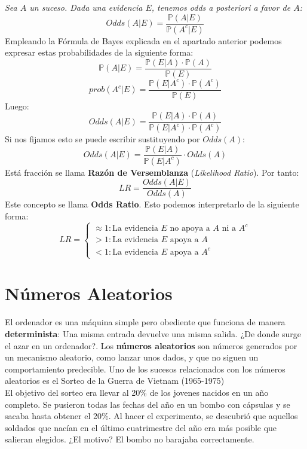 \documentclass[11pt]{article}
\newcommand{\prob}{\mathbb{P}}
\theoremstyle{plain}
\begin{document}
            \textit{Sea $A$ un suceso. Dada una evidencia $E$, tenemos odds a posteriori a favor de $A$:}
            \[Odds(A|E) = \frac{\prob(A|E)}{\prob(A^c|E)}\]
            Empleando la Fórmula de Bayes explicada en el apartado anterior podemos expresar estas probabilidades de la siguiente forma:
            \[\prob(A|E) = \frac{\prob(E|A) \cdot \prob(A)}{\prob(E)}\]
            \[prob(A^c|E) = \frac{\prob(E|A^c)\cdot \prob(A^c)}{\prob(E)}\]
            Luego:
            \[Odds(A|E) = \frac{\prob(E|A) \cdot \prob(A)}{\prob(E|A^c)\cdot \prob(A^c)}\]
            Si nos fijamos esto se puede escribir sustituyendo por $Odds(A)$:
            \[Odds(A|E) = \frac{\prob(E|A)}{\prob(E|A^c)}\cdot Odds(A)\]
            Está fracción se llama \textbf{Razón de Versemblanza} (\textit{Likelihood Ratio}). Por tanto:
            \[LR = \frac{Odds(A|E)}{Odds(A)}\]
            Este concepto se llama \textbf{Odds Ratio}. Esto podemos interpretarlo de la siguiente forma:
            \begin{equation}
                LR = 
                \begin{cases}
                    \approx 1: \text{La evidencia $E$ no apoya a $A$ ni a $A^c$}\\
                    > 1: \text{La evidencia $E$ apoya a $A$}\\
                    < 1:  \text{La evidencia $E$ apoya a $A^c$}    
                \end{cases}
            \end{equation}
    \section{Números Aleatorios} %
    \label{sec:números_aleatorios}
        El ordenador es una máquina simple pero obediente que funciona de manera \textbf{determinista}: Una misma entrada devuelve una misma salida. ¿De donde surge el azar en un ordenador?. Los \textbf{números aleatorios} son números generados por un mecanismo aleatorio, como lanzar unos dados, y que no siguen un comportamiento predecible. Uno de los sucesos relacionados con los números aleatorios es el Sorteo de la Guerra de Vietnam (1965-1975)\\

        El objetivo del sorteo era llevar al 20$\%$ de los jovenes nacidos en un año completo. Se pusieron todas las fechas del año en un bombo con cápsulas y se sacaba hasta obtener el 20$\%$. Al hacer el experimento, se descubrió que aquellos soldados que nacían en el último cuatrimestre del año era más posible que salieran elegidos. ¿El motivo? El bombo no barajaba correctamente.\\
\end{document}
